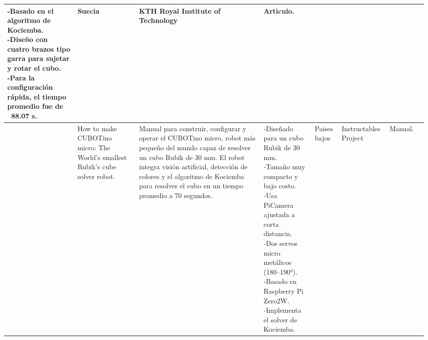 \begin{sidewaystable}
\begin{tabular}{m{5mm} m{25mm} m{45mm} m{40mm} m{15mm} m{18mm} m{12mm} m{14mm}}
{    -Basado en el algoritmo de Kociemba.\\
    -Diseño con cuatro brazos tipo garra para sujetar y rotar el cubo.\\
    -Para la configuración rápida, el tiempo promedio fue de ~88.07 s.\\
     }
 & 
    \centering Suecia & \centering KTH Royal Institute of Technology
 & \centering Articulo. &  \\
    \midrule
    \centering 3 & \centering How to make CUBOTino micro: The World’s smallest Rubik’s cube solver robot. & \parbox{45mm}{ Manual para construir, configurar y operar el CUBOTino micro, robot más pequeño del mundo capaz de resolver un cubo Rubik de 30 mm.  El robot integra visión artificial, detección de colores y el algoritmo de Kociemba para resolver el cubo en un tiempo promedio a 70 segundos.} & 
    \parbox{40mm}{
    -Diseñado para un cubo Rubik de 30 mm.\\
    -Tamaño muy compacto y bajo costo.\\
    -Usa PiCamera ajustada a corta distancia.\\
    -Dos servos micro metálicos (180--190°).\\
    -Basado en Raspberry Pi Zero2W.\\
    -Implementa el solver de Kociemba.\\
    } & 
    \centering Paises bajos & \centering Instructables Project & \centering Manual. &  \\
    \bottomrule
  \end{tabular}  
\end{sidewaystable}

